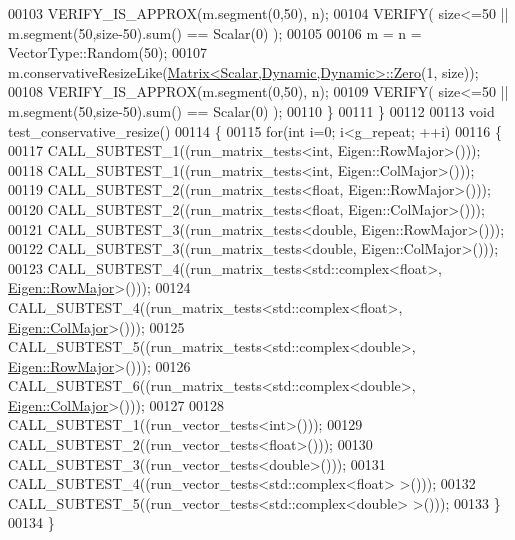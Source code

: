 \begin{DoxyCode}
00103     VERIFY\_IS\_APPROX(m.segment(0,50), n);
00104     VERIFY( size<=50 || m.segment(50,size-50).sum() == Scalar(0) );
00105     
00106     m = n = VectorType::Random(50);
00107     m.conservativeResizeLike(\hyperlink{group___core___module_class_eigen_1_1_matrix}{Matrix<Scalar,Dynamic,Dynamic>::Zero}(1,
      size));
00108     VERIFY\_IS\_APPROX(m.segment(0,50), n);
00109     VERIFY( size<=50 || m.segment(50,size-50).sum() == Scalar(0) );
00110   \}
00111 \}
00112 
00113 \textcolor{keywordtype}{void} test\_conservative\_resize()
00114 \{
00115   \textcolor{keywordflow}{for}(\textcolor{keywordtype}{int} i=0; i<g\_repeat; ++i)
00116   \{
00117     CALL\_SUBTEST\_1((run\_matrix\_tests<int, Eigen::RowMajor>()));
00118     CALL\_SUBTEST\_1((run\_matrix\_tests<int, Eigen::ColMajor>()));
00119     CALL\_SUBTEST\_2((run\_matrix\_tests<float, Eigen::RowMajor>()));
00120     CALL\_SUBTEST\_2((run\_matrix\_tests<float, Eigen::ColMajor>()));
00121     CALL\_SUBTEST\_3((run\_matrix\_tests<double, Eigen::RowMajor>()));
00122     CALL\_SUBTEST\_3((run\_matrix\_tests<double, Eigen::ColMajor>()));
00123     CALL\_SUBTEST\_4((run\_matrix\_tests<std::complex<float>, \hyperlink{group__enums_ggaacded1a18ae58b0f554751f6cdf9eb13acfcde9cd8677c5f7caf6bd603666aae3}{Eigen::RowMajor}>()));
00124     CALL\_SUBTEST\_4((run\_matrix\_tests<std::complex<float>, \hyperlink{group__enums_ggaacded1a18ae58b0f554751f6cdf9eb13a0cbd4bdd0abcfc0224c5fcb5e4f6669a}{Eigen::ColMajor}>()));
00125     CALL\_SUBTEST\_5((run\_matrix\_tests<std::complex<double>, \hyperlink{group__enums_ggaacded1a18ae58b0f554751f6cdf9eb13acfcde9cd8677c5f7caf6bd603666aae3}{Eigen::RowMajor}>()));
00126     CALL\_SUBTEST\_6((run\_matrix\_tests<std::complex<double>, \hyperlink{group__enums_ggaacded1a18ae58b0f554751f6cdf9eb13a0cbd4bdd0abcfc0224c5fcb5e4f6669a}{Eigen::ColMajor}>()));
00127 
00128     CALL\_SUBTEST\_1((run\_vector\_tests<int>()));
00129     CALL\_SUBTEST\_2((run\_vector\_tests<float>()));
00130     CALL\_SUBTEST\_3((run\_vector\_tests<double>()));
00131     CALL\_SUBTEST\_4((run\_vector\_tests<std::complex<float> >()));
00132     CALL\_SUBTEST\_5((run\_vector\_tests<std::complex<double> >()));
00133   \}
00134 \}
\end{DoxyCode}
